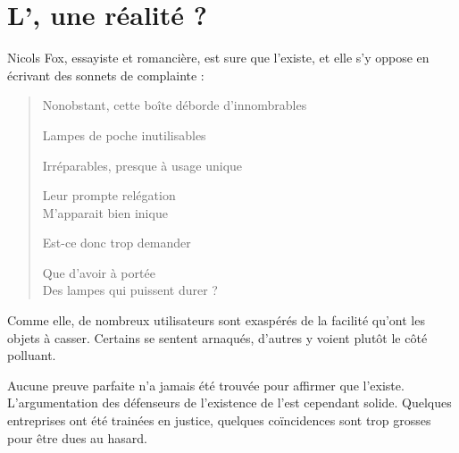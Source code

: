 \section{L'\op, une réalité ?}

Nicols Fox, essayiste et romancière, est sure que l'\op existe, et elle s'y oppose en écrivant des sonnets de complainte : 
\itshape\begin{center}
\begin{verse}
Nonobstant, cette boîte déborde d'innombrables

Lampes de poche inutilisables

Irréparables, presque à usage unique

Leur prompte relégation\\
M'apparait bien inique

Est-ce donc trop demander

Que d'avoir à portée\\
Des lampes qui puissent durer ?
\end{verse}
\end{center}
\normalfont
Comme elle, de nombreux utilisateurs sont exaspérés de la facilité qu'ont les objets à casser. Certains se sentent arnaqués, d'autres y voient plutôt le côté polluant. 

\smallbreak

Aucune preuve parfaite n'a jamais été trouvée pour affirmer que l'\op existe. L'argumentation des défenseurs de l'existence de l'\op est cependant solide. Quelques entreprises ont été trainées en justice, quelques coïncidences sont trop grosses pour être dues au hasard. 